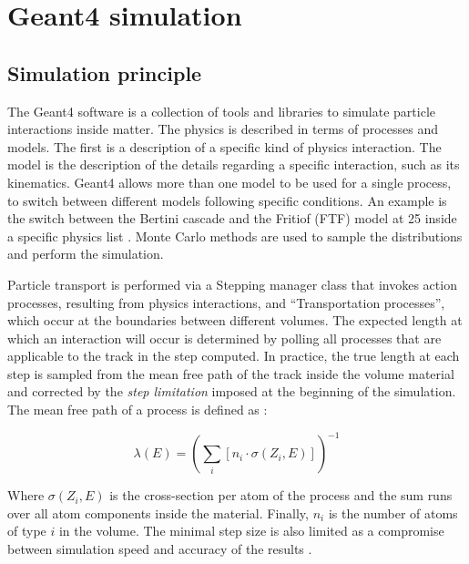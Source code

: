 
\newcommand{\appdirc}{appendices/plots/appendixC}

\chapter{Geant4 simulation}

\label{AppendixC}

\section{Simulation principle}
\label{appC:sec:simulation-principle}

The Geant4 software \cite{AGOSTINELLI2003250} is a collection of tools and libraries to simulate particle interactions inside matter. The physics is described in terms of processes and models. The first is a description of a specific kind of physics interaction. The model is the description of the details regarding a specific interaction, such as its kinematics. Geant4 allows more than one model to be used for a single process, to switch between different models following specific conditions. An example is the switch between the Bertini cascade \cite{Heikkinen:2003sc} and the Fritiof (FTF) model at 25 \gev inside a specific physics list \cite{Uzhinsky:2013hea}. Monte Carlo methods are used to sample the distributions and perform the simulation.

Particle transport is performed via a Stepping manager class that invokes action processes, resulting from physics interactions, and ``Transportation processes'', which occur at the boundaries between different volumes. The expected length at which an interaction will occur is determined by polling all processes that are applicable to the track in the step computed. In practice, the true length at each step is sampled from the mean free path of the track inside the volume material and corrected by the \textit{step limitation} imposed at the beginning of the simulation. The mean free path of a process is defined as \cite{AGOSTINELLI2003250}:

\begin{equation}
  \label{eq:mfp-g4}
  \lambda(E) = \left( \sum_i [ n_i \cdot \sigma(Z_i,E)] \right)^{-1}
\end{equation}

Where $\sigma(Z_i,E)$ is the cross-section per atom of the process and the sum runs over all atom components inside the material. Finally, $n_i$  is the number of atoms of type $i$ in the volume. The minimal step size is also limited as a compromise between simulation speed and accuracy of the results \cite{geant4-phys-guide}.

